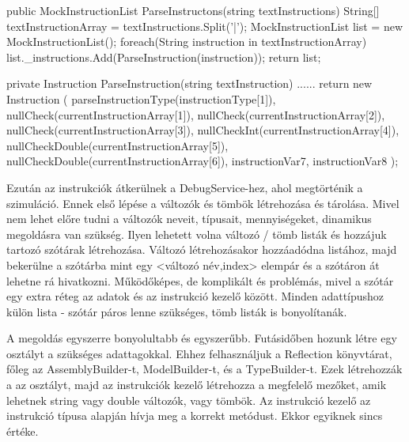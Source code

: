 \begin{cpp}
public MockInstructionList ParseInstructons(string textInstructions)
        {
            String[] textInstructionArray = textInstructions.Split('|');
            MockInstructionList list = new MockInstructionList();
            foreach(String instruction in textInstructionArray)
            {         
                list._instructions.Add(ParseInstruction(instruction));
            }
            return list;
        }
        
private Instruction ParseInstruction(string textInstruction)
        {
            ......
            return  new Instruction
                (
                    parseInstructionType(instructionType[1]),
                    nullCheck(currentInstructionArray[1]),
                    nullCheck(currentInstructionArray[2]),
                    nullCheck(currentInstructionArray[3]), 
                    nullCheckInt(currentInstructionArray[4]),
                    nullCheckDouble(currentInstructionArray[5]),
                    nullCheckDouble(currentInstructionArray[6]),
                    instructionVar7,
                    instructionVar8
                 );
        }
\end{cpp}


Ezután az instrukciók átkerülnek a DebugService-hez, ahol megtörténik a szimuláció.
Ennek első lépése a változók és tömbök létrehozása és tárolása. Mivel nem lehet előre tudni a változók neveit, típusait, mennyiségeket, dinamikus megoldásra van szükség. Ilyen lehetett volna változó / tömb listák és hozzájuk tartozó szótárak létrehozása. Változó létrehozásakor hozzáadódna listához, majd bekerülne a szótárba mint egy <változó név,index> elempár és a szótáron át lehetne rá hivatkozni. Működőképes, de komplikált és problémás, mivel a szótár egy extra réteg az adatok és az instrukció kezelő között. Minden adattípushoz külön lista - szótár páros lenne szükséges, tömb listák is bonyolítanák.

A megoldás egyszerre bonyolultabb és egyszerűbb. Futásidőben hozunk létre egy osztályt a szükséges adattagokkal. Ehhez felhasználjuk a Reflection könyvtárat, főleg az AssemblyBuilder-t, ModelBuilder-t, és a TypeBuilder-t. Ezek létrehozzák a az osztályt, majd az instrukciók kezelő létrehozza a megfelelő mezőket, amik lehetnek string vagy double változók, vagy tömbök. Az instrukció kezelő az instrukció típusa alapján hívja meg a korrekt metódust. Ekkor egyiknek sincs értéke.

